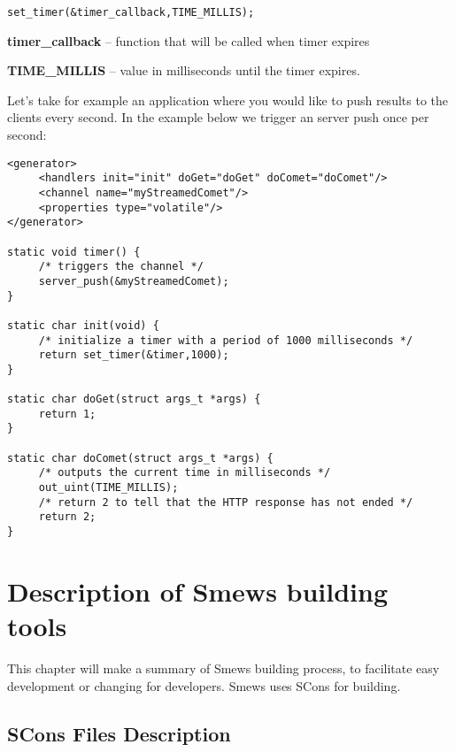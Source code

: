 \documentclass{report}
\begin{document}
\begin{verbatim}
set_timer(&timer_callback,TIME_MILLIS);
\end{verbatim}

\begin{description}
\item \textbf{timer\_callback} -- function that will be called when timer expires
\item \textbf{TIME\_MILLIS} -- value in milliseconds until the timer expires.
\end{description}

Let's take for example an application where you would like to push results to the clients every second.
In the example below we trigger an server push once per second:
\begin{verbatim}
<generator>
     <handlers init="init" doGet="doGet" doComet="doComet"/>
     <channel name="myStreamedComet"/>
     <properties type="volatile"/>
</generator>

static void timer() {
     /* triggers the channel */
     server_push(&myStreamedComet);
}

static char init(void) {
     /* initialize a timer with a period of 1000 milliseconds */
     return set_timer(&timer,1000);
}

static char doGet(struct args_t *args) {
     return 1;
}

static char doComet(struct args_t *args) {
     /* outputs the current time in milliseconds */
     out_uint(TIME_MILLIS);
     /* return 2 to tell that the HTTP response has not ended */
     return 2;
}
\end{verbatim}

\chapter{Description of Smews building tools}
\label{chap:tools}

This chapter will make a summary of Smews building process, to facilitate easy development or changing for developers.
Smews uses SCons for building.

\section{SCons Files Description}
\label{sec:scons}
\end{document}
